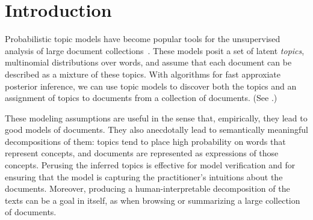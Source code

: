 %
%
%
%
%

\section{Introduction}




Probabilistic topic models have become popular tools for the
unsupervised analysis of large document collections~\cite{blei-09}.
These models posit a set of latent \emph{topics}, multinomial
distributions over words, and assume that each document can be
described as a mixture of these topics.  With algorithms for fast
approxiate posterior inference, we can use topic models to discover
both the topics and an assignment of topics to documents from a
collection of documents.  (See .)

These modeling assumptions are useful in the sense that, empirically,
they lead to good models of documents.  They also anecdotally
lead to semantically meaningful decompositions of them: topics tend to
place high probability on words that represent concepts, and documents
are represented as expressions of those concepts.  Perusing the
inferred topics is effective for model verification and for ensuring
that the model is capturing the practitioner's intuitions about the
documents.  Moreover, producing a human-interpretable decomposition of
the texts can be a goal in itself, as when browsing or summarizing a
large collection of
documents.


